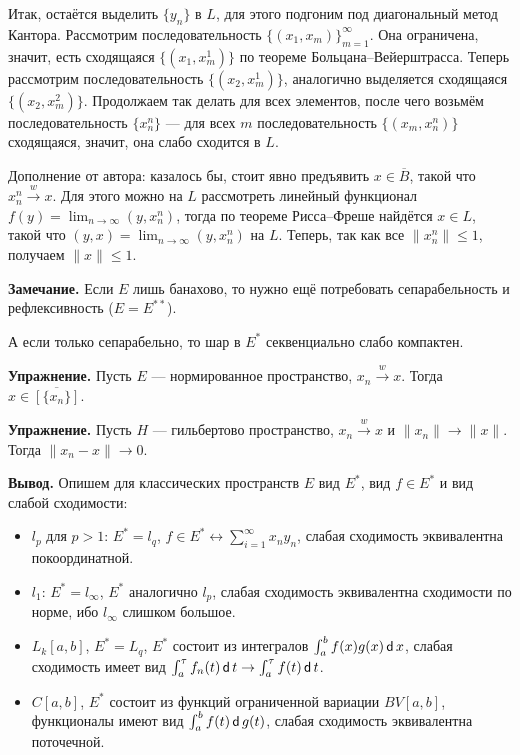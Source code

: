 Итак, остаётся выделить $\{y_n\}$ в $L$, для этого подгоним под диагональный метод Кантора.
Рассмотрим последовательность $\{(x_1, x_m)\}_{m=1}^\infty$.
Она ограничена, значит, есть сходящаяся $\{(x_1, x_m^1)\}$ по теореме Больцана--Вейерштрасса.
Теперь рассмотрим последовательность $\{(x_2, x_m^1)\}$, аналогично выделяется сходящаяся $\{(x_2, x_m^2)\}$.
Продолжаем так делать для всех элементов, после чего возьмём последовательность $\{x_n^n\}$ --- для всех $m$ последовательность $\{(x_m, x_n^n)\}$ сходящаяся, значит, она слабо сходится в $L$.

Дополнение от автора: казалось бы, стоит явно предъявить $x \in \overline B$, такой что $x_n^n \xrightarrow{w} x$.
Для этого можно на $L$ рассмотреть линейный функционал $f(y) = \lim_{n \to \infty} (y, x_n^n)$, тогда по теореме Рисса--Фреше найдётся $x \in L$, такой что $(y, x) = \lim_{n \to \infty} (y, x_n^n)$ на $L$.
Теперь, так как все $\|x_n^n\| \le 1$, получаем $\|x\| \le 1$.

\QED

\textbf{Замечание.} Если $E$ лишь банахово, то нужно ещё потребовать сепарабельность и рефлексивность ($E = E^{**}$).

А если только сепарабельно, то шар в $E^*$ секвенциально слабо компактен.

\textbf{Упражнение.} Пусть $E$ --- нормированное пространство, $x_n \xrightarrow{w} x$.
Тогда $x \in \overline{[\{x_n\}]}$.

\textbf{Упражнение.} Пусть $H$ --- гильбертово пространство, $x_n \xrightarrow{w} x$ и $\|x_n\| \to \|x\|$.
Тогда $\|x_n - x\| \to 0$.

\textbf{Вывод.} Опишем для классических пространств $E$ вид $E^*$, вид $f \in E^*$ и вид слабой сходимости:
\begin{itemize}
    \item $l_p$ для $p > 1$: $E^* = l_q$, $f \in E^* \leftrightarrow \sum_{i=1}^{\infty} x_n y_n$, слабая сходимость эквивалентна покоординатной.
    \item $l_1$: $E^* = l_\infty$, $E^*$ аналогично $l_p$, слабая сходимость эквивалентна сходимости по норме, ибо $l_\infty$ слишком большое.
    \item $L_k[a, b]$, $E^* = L_q$, $E^*$ состоит из интегралов $\int_a^b f(x) g(x) \operatorname{\mathsf d} x$, слабая сходимость имеет вид $\int_a^\tau f_n(t) \operatorname{\mathsf d} t \to \int_a^\tau f(t) \operatorname{\mathsf d} t$.
    \item $C[a, b]$, $E^*$ состоит из функций ограниченной вариации $BV[a, b]$, функционалы имеют вид $\int_a^b f(t) \operatorname{\mathsf d} g(t)$, слабая сходимость эквивалентна поточечной.
\end{itemize}

